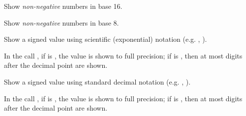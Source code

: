 \begin{haddockdesc}
\item[\begin{tabular}{@{}l}
showHex :: Integral a => a -> ShowS
\end{tabular}]
{\haddockbegindoc
Show \emph{non-negative}  numbers in base 16.\par}
\end{haddockdesc}
\begin{haddockdesc}
\item[\begin{tabular}{@{}l}
showOct :: Integral a => a -> ShowS
\end{tabular}]
{\haddockbegindoc
Show \emph{non-negative}  numbers in base 8.\par}
\end{haddockdesc}
\begin{haddockdesc}
\item[\begin{tabular}{@{}l}
showEFloat :: RealFloat a => Maybe Int -> a -> ShowS
\end{tabular}]
{\haddockbegindoc
Show a signed  value
 using scientific (exponential) notation (e.g. , ).\par
In the call , if  is ,
 the value is shown to full precision; if  is ,
 then at most  digits after the decimal point are shown.\par}
\end{haddockdesc}
\begin{haddockdesc}
\item[\begin{tabular}{@{}l}
showFFloat :: RealFloat a => Maybe Int -> a -> ShowS
\end{tabular}]
{\haddockbegindoc
Show a signed  value
 using standard decimal notation (e.g. , ).\par
In the call , if  is ,
 the value is shown to full precision; if  is ,
 then at most  digits after the decimal point are shown.\par}
\end{haddockdesc}
